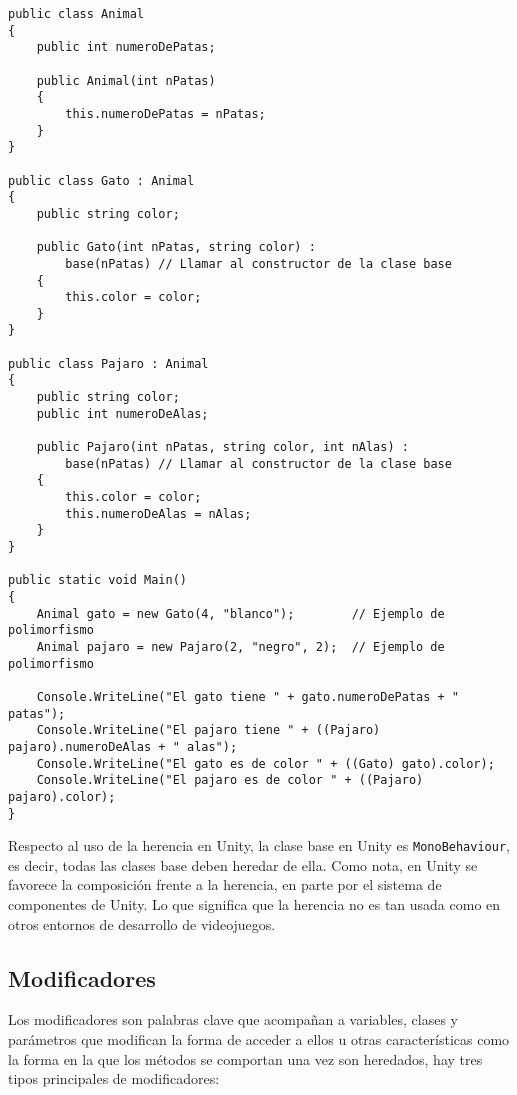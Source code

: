 \documentclass{pre-tfg}
\begin{document}
\begin{spacing}{1}
\begin{lstlisting}[float=htbp, caption={Ejemplo de clase con campos, sobrecarga de métodos y constructor}, label=lst:hierarchy]
public class Animal
{ 
	public int numeroDePatas;
	
	public Animal(int nPatas)
	{
		this.numeroDePatas = nPatas;
	}	
}

public class Gato : Animal
{
	public string color;
	
	public Gato(int nPatas, string color) :
		base(nPatas) // Llamar al constructor de la clase base
	{		
		this.color = color;
	}	
}

public class Pajaro : Animal
{
	public string color;
	public int numeroDeAlas;
	
	public Pajaro(int nPatas, string color, int nAlas) :
		base(nPatas) // Llamar al constructor de la clase base
	{		
		this.color = color;
		this.numeroDeAlas = nAlas;
	}	
}

public static void Main()
{
	Animal gato = new Gato(4, "blanco");        // Ejemplo de polimorfismo
	Animal pajaro = new Pajaro(2, "negro", 2);  // Ejemplo de polimorfismo
		
	Console.WriteLine("El gato tiene " + gato.numeroDePatas + " patas");
	Console.WriteLine("El pajaro tiene " + ((Pajaro) pajaro).numeroDeAlas + " alas");
	Console.WriteLine("El gato es de color " + ((Gato) gato).color);
	Console.WriteLine("El pajaro es de color " + ((Pajaro) pajaro).color);
}
\end{lstlisting}
\end{spacing}

Respecto al uso de la herencia en Unity, la clase base en Unity es \texttt{MonoBehaviour}, es decir, todas las clases base deben heredar de ella. Como nota, en Unity se favorece la composición frente a la herencia, en parte por el sistema de componentes de Unity. Lo que significa que la herencia no es tan usada como en otros entornos de desarrollo de videojuegos.

\subsection{Modificadores}

Los modificadores son palabras clave que acompañan a variables, clases y parámetros que modifican la forma de acceder a ellos u otras características como la forma en la que los métodos se comportan una vez son heredados, hay tres tipos principales de modificadores:
\end{document}
